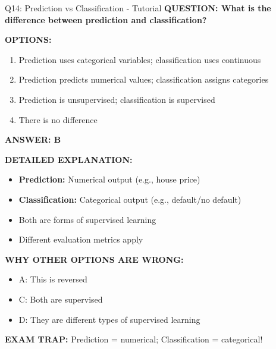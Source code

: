 \documentclass[8pt]{beamer}
\begin{document}
	\begin{frame}{Q14: Prediction vs Classification - Tutorial}
		\fontsize{6.5}{7.5}\selectfont
		\textbf{QUESTION: What is the difference between prediction and classification?}
		
		\vspace{0.1cm}
		\textbf{OPTIONS:}
		\begin{enumerate}
			\item Prediction uses categorical variables; classification uses continuous
			\item Prediction predicts numerical values; classification assigns categories
			\item Prediction is unsupervised; classification is supervised
			\item There is no difference
		\end{enumerate}
		
		\vspace{0.1cm}
		\textcolor{myblue}{\textbf{ANSWER: B}}
		
		\vspace{0.1cm}
		\textbf{DETAILED EXPLANATION:}
		\begin{itemize}
			\item \textbf{Prediction:} Numerical output (e.g., house price)
			\item \textbf{Classification:} Categorical output (e.g., default/no default)
			\item Both are forms of supervised learning
			\item Different evaluation metrics apply
		\end{itemize}
		
		\vspace{0.1cm}
		\textcolor{myred}{\textbf{WHY OTHER OPTIONS ARE WRONG:}}
		\begin{itemize}
			\item \textcolor{myred}{A:} This is reversed
			\item \textcolor{myred}{C:} Both are supervised
			\item \textcolor{myred}{D:} They are different types of supervised learning
		\end{itemize}
		
		\textcolor{myred}{\textbf{EXAM TRAP:}} Prediction = \textcolor{myblue}{numerical}; Classification = \textcolor{myblue}{categorical}!
	\end{frame}
	
\end{document}
